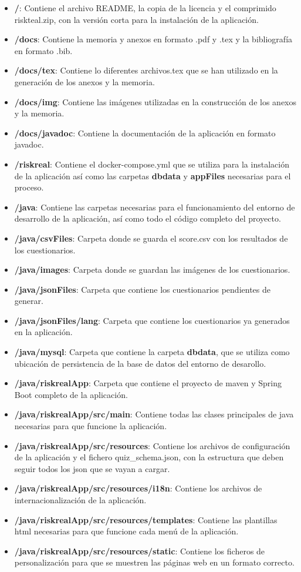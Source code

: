 \begin{itemize}
	\item \textbf{/}: Contiene el archivo README, la copia de la licencia y el comprimido riskteal.zip, con la versión corta para la instalación de la aplicación.
	\item \textbf{/docs}: Contiene la memoria y anexos en formato .pdf y .tex y la bibliografía en formato .bib.
	\item \textbf{/docs/tex}: Contiene lo diferentes archivos.tex que se han utilizado en la generación de los anexos y la memoria.
	\item \textbf{/docs/img}: Contiene las imágenes utilizadas en la construcción de los anexos y la memoria.
	\item \textbf{/docs/javadoc}: Contiene la documentación de la aplicación en formato javadoc.
	\item \textbf{/riskreal}: Contiene el docker-compose.yml que se utiliza para la instalación de la aplicación así como las carpetas \textbf{dbdata} y \textbf{appFiles} necesarias para el proceso.
	\item \textbf{/java}: Contiene las carpetas necesarias para el funcionamiento del entorno de desarrollo de la aplicación, así como todo el código completo del proyecto.
	\item \textbf{/java/csvFiles}: Carpeta donde se guarda el score.csv con los resultados de los cuestionarios.
	\item \textbf{/java/images}: Carpeta donde se guardan las imágenes de los cuestionarios.
	\item \textbf{/java/jsonFiles}: Carpeta que contiene los cuestionarios pendientes de generar.
	\item \textbf{/java/jsonFiles/lang}: Carpeta que contiene los cuestionarios ya generados en la aplicación.
	\item \textbf{/java/mysql}: Carpeta que contiene la carpeta \textbf{dbdata}, que se utiliza como ubicación de persistencia de la base de datos del entorno de desarollo.
	\item \textbf{/java/riskrealApp}: Carpeta que contiene el proyecto de maven y Spring Boot completo de la aplicación.
	\item \textbf{/java/riskrealApp/src/main}: Contiene todas las clases principales de java necesarias para que funcione la aplicación.
	\item \textbf{/java/riskrealApp/src/resources}: Contiene los archivos de configuración de la aplicación y el fichero quiz\_schema.json, con la estructura que deben seguir todos los json que se vayan a cargar.
	\item \textbf{/java/riskrealApp/src/resources/i18n}: Contiene los archivos de internacionalización de la aplicación.
	\item \textbf{/java/riskrealApp/src/resources/templates}:  Contiene las plantillas html necesarias para que funcione cada menú de la aplicación.
	\item \textbf{/java/riskrealApp/src/resources/static}: Contiene los ficheros de personalización para que se muestren las páginas web en un formato correcto. 
\end{itemize}


